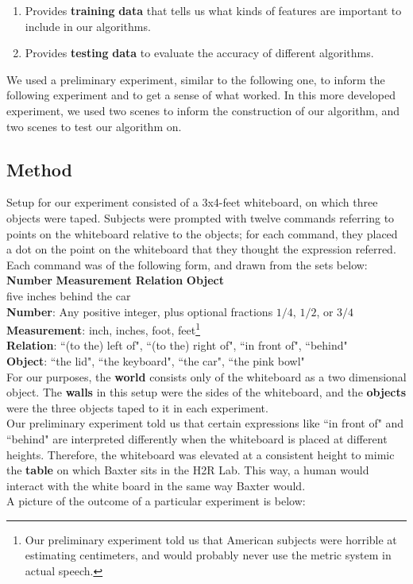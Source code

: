 \documentclass[12pt,letterpaper]{article}
\newcommand\tab[1][1cm]{\hspace*{#1}}
\begin{document}
\begin{enumerate}[(1)]

\item Provides \textbf{training} \textbf{data} that tells us what kinds of features are important to include in our algorithms.\\
\item Provides \textbf{testing} \textbf{data} to evaluate the accuracy of different algorithms.
\end{enumerate}

We used a preliminary experiment, similar to the following one, to inform the following experiment and to get a sense of what worked. In this more developed experiment, we used two scenes to inform the construction of our algorithm, and two scenes to test our algorithm on.

\subsection{Method}

Setup for our experiment consisted of a 3x4-feet whiteboard, on which three objects were taped. Subjects were prompted with twelve commands referring to points on the whiteboard relative to the objects; for each command, they placed a dot on the point on the whiteboard that they thought the expression referred. Each command was of the following form, and drawn from the sets below:\\

\noindent \textbf{Number} \tab	\textbf{Measurement}	 \tab	\textbf{Relation} \tab		\textbf{Object}\\
five		\tab \tab  	inches	\tab\tab\tab   	behind	\tab	 	the car\\

\noindent \textbf{Number}: Any positive integer, plus optional fractions $1/4$, $1/2$, or $3/4$ \\
\textbf{Measurement}: inch, inches, foot, feet\footnote{Our preliminary experiment told us that American subjects were horrible at estimating centimeters, and would probably never use the metric system in actual speech.}\\
\textbf{Relation}: ``(to the) left of", ``(to the) right of", ``in front of", ``behind"\\
\textbf{Object}: ``the lid", ``the keyboard", ``the car", ``the pink bowl"\\

For our purposes, the \textbf{world} consists only of the whiteboard as a two dimensional object. The \textbf{walls} in this setup were the sides of the whiteboard, and the \textbf{objects} were the three objects taped to it in each experiment.\\
\tab Our preliminary experiment told us that certain expressions like ``in front of" and ``behind" are interpreted differently when the whiteboard is placed at different heights. Therefore, the whiteboard was elevated at a consistent height to mimic the \textbf{table} on which Baxter sits in the H2R Lab. This way, a human would interact with the white board in the same way Baxter would.\\
\tab A picture of the outcome of a particular experiment is below:
\end{document}
